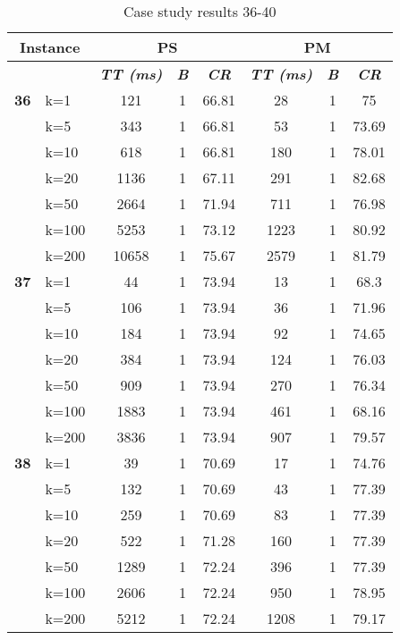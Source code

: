     \begin{table}[htbp]
    \caption{Case study results 36-40}
    \centering
    \begin{tabular}{|l|l|c|c|c|c|c|c|}
    \hline
    \multicolumn{ 2}{|c|}{\textbf{Instance}} & \multicolumn{ 3}{c|}{\textbf{PS}} & \multicolumn{ 3}{c|}{\textbf{PM}} \\ \hline
    \multicolumn{ 2}{|l|}{} & \textbf{\textit{TT (ms)}} & \textbf{\textit{B}} & \textbf{\textit{CR}} & \textbf{\textit{TT (ms)}} & \textbf{\textit{B}} & \textbf{\textit{CR}} \\ \hline
    \multicolumn{1}{|r|}{\textbf{36}} & k=1 & 121 & 1 & 66.81 & 28 & 1 & 75 \\ 
     & k=5 & 343 & 1 & 66.81 & 53 & 1 & 73.69 \\ 
     & k=10 & 618 & 1 & 66.81 & 180 & 1 & 78.01 \\ 
     & k=20 & 1136 & 1 & 67.11 & 291 & 1 & 82.68 \\ 
     & k=50 & 2664 & 1 & 71.94 & 711 & 1 & 76.98 \\ 
     & k=100 & 5253 & 1 & 73.12 & 1223 & 1 & 80.92 \\ 
     & k=200 & 10658 & 1 & 75.67 & 2579 & 1 & 81.79 \\ \hline
    \multicolumn{1}{|r|}{\textbf{37}} & k=1 & 44 & 1 & 73.94 & 13 & 1 & 68.3 \\ 
     & k=5 & 106 & 1 & 73.94 & 36 & 1 & 71.96 \\ 
     & k=10 & 184 & 1 & 73.94 & 92 & 1 & 74.65 \\ 
     & k=20 & 384 & 1 & 73.94 & 124 & 1 & 76.03 \\ 
     & k=50 & 909 & 1 & 73.94 & 270 & 1 & 76.34 \\ 
     & k=100 & 1883 & 1 & 73.94 & 461 & 1 & 68.16 \\ 
     & k=200 & 3836 & 1 & 73.94 & 907 & 1 & 79.57 \\ \hline
    \multicolumn{1}{|r|}{\textbf{38}} & k=1 & 39 & 1 & 70.69 & 17 & 1 & 74.76 \\ 
     & k=5 & 132 & 1 & 70.69 & 43 & 1 & 77.39 \\ 
     & k=10 & 259 & 1 & 70.69 & 83 & 1 & 77.39 \\ 
     & k=20 & 522 & 1 & 71.28 & 160 & 1 & 77.39 \\ 
     & k=50 & 1289 & 1 & 72.24 & 396 & 1 & 77.39 \\ 
     & k=100 & 2606 & 1 & 72.24 & 950 & 1 & 78.95 \\ 
     & k=200 & 5212 & 1 & 72.24 & 1208 & 1 & 79.17 \\ \hline

\end{tabular}
\end{table}
